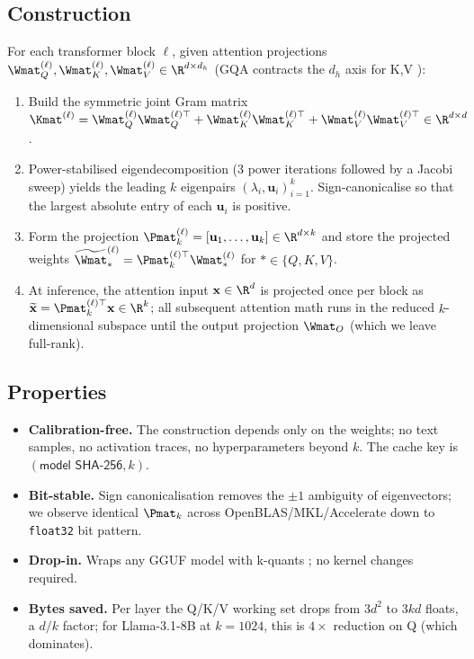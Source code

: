 \documentclass[11pt]{article}
\begin{document}
\subsection{Construction}
For each transformer block $\ell$, given attention projections
$\Wmat_Q^{(\ell)},\Wmat_K^{(\ell)},\Wmat_V^{(\ell)}\in\R^{d\times d_h}$
(GQA contracts the $d_h$ axis for K,V \cite{ainslie2023gqa}):
\begin{enumerate}
\item Build the symmetric joint Gram matrix
$\Kmat^{(\ell)} = \Wmat_Q^{(\ell)}\Wmat_Q^{(\ell)\top}+\Wmat_K^{(\ell)}\Wmat_K^{(\ell)\top}+\Wmat_V^{(\ell)}\Wmat_V^{(\ell)\top}\in\R^{d\times d}$.
\item Power-stabilised eigendecomposition (3 power iterations followed by a
Jacobi sweep) yields the leading $k$ eigenpairs
$(\lambda_i,\mathbf{u}_i)_{i=1}^k$.  Sign-canonicalise so that the largest
absolute entry of each $\mathbf{u}_i$ is positive.
\item Form the projection $\Pmat_k^{(\ell)}=[\mathbf{u}_1,\dots,\mathbf{u}_k]
\in\R^{d\times k}$ and store the projected weights
$\widetilde{\Wmat}_*^{(\ell)} = \Pmat_k^{(\ell)\top}\Wmat_*^{(\ell)}$ for
$*\in\{Q,K,V\}$.
\item At inference, the attention input $\mathbf{x}\in\R^d$ is projected once
per block as $\widetilde{\mathbf{x}} = \Pmat_k^{(\ell)\top}\mathbf{x}\in\R^k$;
all subsequent attention math runs in the reduced $k$-dimensional subspace
until the output projection $\Wmat_O$ (which we leave full-rank).
\end{enumerate}

\subsection{Properties}
\begin{itemize}
\item \textbf{Calibration-free.}  The construction depends only on the
weights; no text samples, no activation traces, no hyperparameters beyond
$k$.  The cache key is $(\textsf{model SHA-256}, k)$.
\item \textbf{Bit-stable.}  Sign canonicalisation removes the
$\pm1$ ambiguity of eigenvectors; we observe identical $\Pmat_k$ across
OpenBLAS/MKL/Accelerate down to \texttt{float32} bit pattern.
\item \textbf{Drop-in.}  Wraps any GGUF \cite{ggerganov2023gguf} model with
k-quants \cite{ggerganov2023kquants}; no kernel changes required.
\item \textbf{Bytes saved.}  Per layer the Q/K/V working set drops from
$3d^2$ to $3kd$ floats, a $d/k$ factor; for Llama-3.1-8B at $k{=}1024$, this
is $4\times$ reduction on Q (which dominates).
\end{itemize}
\end{document}
